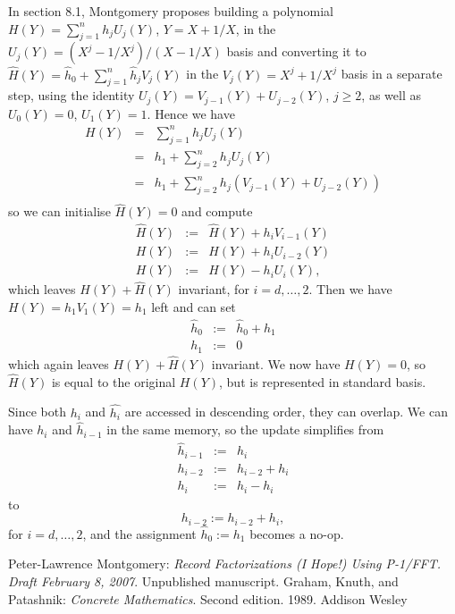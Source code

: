 \documentclass{article}
\begin{document}
In section 8.1, Montgomery proposes building a polynomial 
$H(Y)=\sum_{j=1}^{n} h_j U_j(Y)$, 
$Y=X+1/X$, in the $U_j(Y) = (X^j - 1/X^j)/(X - 1/X)$ basis and converting it
to $\hat{H}(Y)=\hat{h}_0 + \sum_{j=1}^{n} \hat{h}_j V_j(Y)$ 
in the $V_j(Y) = X^j + 1/X^j$ 
basis in a separate step, using the identity 
$U_j(Y) = V_{j-1}(Y) + U_{j-2}(Y)$, $j\geq 2$, as well as $U_0(Y) = 0$, 
$U_1(Y) = 1$. 
Hence we have
\begin{eqnarray*}
  H(Y) & = & \sum_{j=1}^{n} h_j U_j(Y) \\
  & = & h_1 + \sum_{j=2}^{n} h_j U_j(Y) \\
  & = & h_1 + \sum_{j=2}^{n} h_j (V_{j-1}(Y) + U_{j-2}(Y)) \\
\end{eqnarray*}
so we can initialise $\hat{H}(Y) = 0$ and compute 
\begin{eqnarray*}
\hat{H}(Y) & := & \hat{H}(Y) + h_i V_{i-1}(Y) \\
H(Y) & := & H(Y) + h_i U_{i-2}(Y) \\
H(Y) & := & H(Y) - h_i U_i(Y),
\end{eqnarray*}
which leaves $H(Y) + \hat{H}(Y)$ invariant, for $i = d, \ldots, 2$. Then we
have $H(Y) = h_1 V_1(Y) = h_1$ left and can set 
\begin{eqnarray*}
\hat{h}_0 & := & \hat{h}_0 + h_1 \\
h_1 & := & 0
\end{eqnarray*}
which again leaves $H(Y) + \hat{H}(Y)$ invariant. We now have $H(Y) = 0$, so
$\hat{H}(Y)$ is equal to the original $H(Y)$, but is represented in standard 
basis.

Since both $h_i$ and $\hat{h_i}$ are accessed in descending order, they can 
overlap. We can have $h_i$ and $\hat{h}_{i-1}$ in the same memory, so the 
update simplifies from
\begin{eqnarray*}
  \hat{h}_{i-1} & := & h_{i} \\
  h_{i-2} & := & h_{i-2} + h_i \\
  h_i & := & h_i - h_i
\end{eqnarray*}
to
\begin{displaymath}
  h_{i-2} := h_{i-2} + h_i,
\end{displaymath}
for $i = d, \ldots, 2$, and the assignment $\hat{h}_0 := h_1$ becomes a no-op.

\begin{thebibliography}{}
 Peter-Lawrence Montgomery: 
{\it Record Factorizations (I Hope!) Using P-1/FFT. Draft February 8, 2007}. 
Unpublished manuscript.
Graham, Knuth, and Patashnik: 
{\it Concrete Mathematics}. Second edition. 1989. Addison Wesley
\end{thebibliography}
\end{document}
